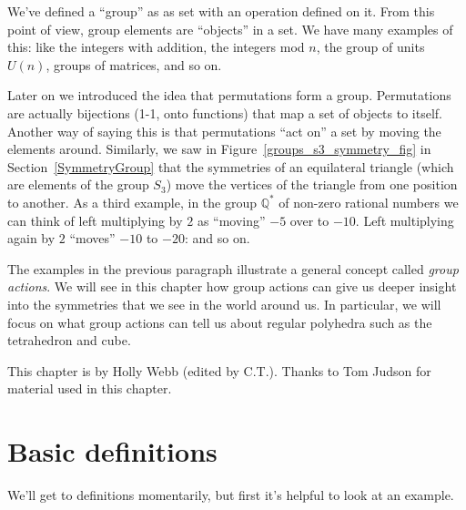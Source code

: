 We've defined a  ``group'' as as set with an operation defined on it.  From this point of view, group elements are ``objects'' in a set. We have many examples of this: like the integers with addition, the integers mod $n$, the group of units $U(n)$, groups of matrices, and so on.

Later on we introduced the idea that permutations form a group. Permutations are actually bijections (1-1, onto functions) that map a set of objects to itself.  Another way of saying this is that permutations ``act on'' a set by moving the elements around.  Similarly, we saw in Figure~\ref{groups_s3_symmetry_fig} in Section~\ref{SymmetryGroup} that the symmetries of an equilateral triangle (which are elements of the group $S_3$) move the vertices of the triangle from one position to another.  As a third example, in the group $\mathbb {Q}^*$ of non-zero rational numbers we can think of left multiplying by $2$ as ``moving''  $-5$ over to $-10$.  Left multiplying again by $2$ ``moves'' $-10$ to $-20$: and so on.   

The examples in the previous paragraph  illustrate a general concept called \emph{group actions}. We will see in this chapter how group actions can give us deeper insight into the symmetries that we see in the world around us. In particular, we will focus on what group actions can tell us about regular polyhedra such as the tetrahedron and cube.
\bigskip

This chapter  is by Holly Webb (edited by C.T.). Thanks to Tom Judson for material used in this chapter.

\section {Basic definitions}\label{DefActions}
We'll get to definitions momentarily, but first it's helpful to look at an example.

